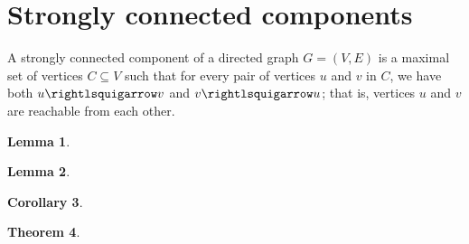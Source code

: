 \documentclass[letter]{book}
\theoremstyle{definition}
\newtheorem{theorem}{Theorem}[chapter]
\newtheorem{lemma}[theorem]{Lemma}
\newtheorem{corollary}[theorem]{Corollary}
\theoremstyle{definition}
\theoremstyle{remark}
\begin{document}
\section{Strongly connected components}
A strongly connected component of a directed graph $G=(V,E)$ is a maximal set of vertices $C\subseteq V$ such that for every pair of vertices $u$ and $v$ in $C$, we have both $u\rightlsquigarrow v$ and $v\rightlsquigarrow u$; that is, vertices $u$ and $v$ are reachable from each other.
\bigskip
\begin{lemma}

\end{lemma}
\bigskip
\begin{lemma}

\end{lemma}
\bigskip
\begin{corollary}

\end{corollary}
\bigskip
\begin{theorem}
    
\end{theorem}
\end{document}
